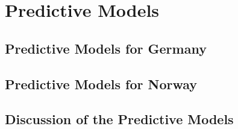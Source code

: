 \section{Predictive Models}
\subsection{Predictive Models for Germany}
\subsection{Predictive Models for Norway}
\subsection{Discussion of the Predictive Models}
